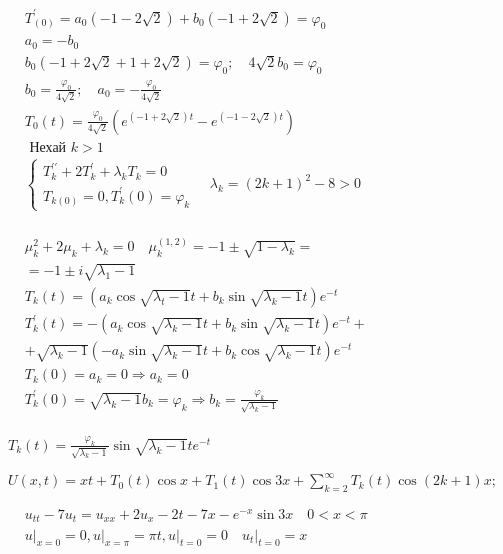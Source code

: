 \begin{center}
    $\begin{aligned} & T_{(0)}^{\prime}=a_0(-1-2 \sqrt{2})+b_0(-1+2 \sqrt{2})=\varphi_0 \\ & a_0=-b_0 \\ & b_0(-1+2 \sqrt{2}+1+2 \sqrt{2})=\varphi_0 ; \quad 4 \sqrt{2} b_0=\varphi_0 \\ & b_0=\frac{\varphi_0}{4 \sqrt{2}} ; \quad a_0=-\frac{\varphi_0}{4 \sqrt{2}} \\ & T_0(t)=\frac{\varphi_0}{4 \sqrt{2}}\left(e^{(-1+2 \sqrt{2}) t}-e^{(-1-2 \sqrt{2}) t}\right) \\ & \text { Нехай } k>1 \\ & \left\{\begin{array}{l}T_k^{\prime \prime}+2 T_k^{\prime}+\lambda_k T_k=0 \\ T_{k(0)}=0, T_k^{\prime}(0)=\varphi_k\end{array} \quad \lambda_k=(2 k+1)^2-8>0\right. \\ & \end{aligned}$

    $\begin{aligned} & \mu_k^2+2 \mu_k+\lambda_k=0 \quad \mu_k^{(1, 2)}=-1 \pm \sqrt{1-\lambda_k}= \\ & =-1 \pm i \sqrt{\lambda_1-1} \\ & T_k(t)=\left(a_k \cos \sqrt{\lambda_t-1} t+b_k \sin \sqrt{\lambda_{k} - 1 } t\right) e^{-t} \\ & T_k^{\prime}(t)=-\left(a_k \cos \sqrt{\lambda_{k} - 1}t+b_k \sin \sqrt{\lambda_{k} - 1}t\right) e^{-t}+ \\ & +\sqrt{\lambda_k - 1}\left(-a_k \sin \sqrt{\lambda_k-1} t+b_k \cos \sqrt{\lambda_k-1} t\right) e^{-t} \\ & T_k(0)=a_k=0 \Rightarrow a_k=0 \\ & T_k^{\prime}(0)=\sqrt{\lambda_k-1} b_k=\varphi_k \Rightarrow b_k=\frac{\varphi_k}{\sqrt{\lambda_k-1}} \\ & \end{aligned}$

    $ T_k(t)=\frac{\varphi_k}{\sqrt{\lambda_k-1}} \sin \sqrt{\lambda_k-1} t e^{-t} $
    

    $ U(x, t)=x t+T_0(t) \cos x+T_1(t)  \cos 3 x +  \sum_{k=2}^{\infty} T_k(t) \cos (2 k + 1) x ;$



\end{center}



\begin{tcolorbox}[title=Task2 (20.16 (4))]
    \begin{center}
        $\begin{aligned} & u_{t t}-7 u_t=u_{x x}+2 u_x-2 t-7 x-e^{-x} \sin 3 x \quad 0<x<\pi \\ & \left.u\right|_{x=0}=0,\left.u\right|_{x=\pi}=\pi t,\left.u\right|_{t=0}=\left.0 \quad u_t\right|_{t=0}=x\end{aligned}$
    \end{center}
\end{tcolorbox}



